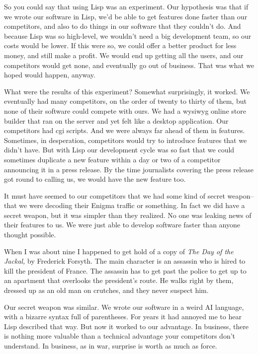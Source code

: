 So you could say that using Lisp was an experiment. Our hypothesis was
that if we wrote our software in Lisp, we'd be able to get features done
faster than our competitors, and also to do things in our software that
they couldn't do. And because Lisp was so high-level, we wouldn't need a
big development team, so our costs would be lower. If this were so, we
could offer a better product for less money, and still make a profit. We
would end up getting all the users, and our competitors would get none,
and eventually go out of business. That was what we hoped would happen,
anyway.

What were the results of this experiment? Somewhat surprisingly, it
worked. We eventually had many competitors, on the order of twenty to
thirty of them, but none of their software could compete with ours. We
had a wysiwyg online store builder that ran on the server and yet felt
like a desktop application. Our competitors had cgi scripts. And we were
always far ahead of them in features. Sometimes, in desperation,
competitors would try to introduce features that we didn't have. But
with Lisp our development cycle was so fast that we could sometimes
duplicate a new feature within a day or two of a competitor announcing
it in a press release. By the time journalists covering the press
release got round to calling us, we would have the new feature too.

It must have seemed to our competitors that we had some kind of secret
weapon-- that we were decoding their Enigma traffic or something. In
fact we did have a secret weapon, but it was simpler than they realized.
No one was leaking news of their features to us. We were just able to
develop software faster than anyone thought possible.

When I was about nine I happened to get hold of a copy of \emph{The Day
of the Jackal,} by Frederick Forsyth. The main character is an assassin
who is hired to kill the president of France. The assassin has to get
past the police to get up to an apartment that overlooks the president's
route. He walks right by them, dressed up as an old man on crutches, and
they never suspect him.

Our secret weapon was similar. We wrote our software in a weird AI
language, with a bizarre syntax full of parentheses. For years it had
annoyed me to hear Lisp described that way. But now it worked to our
advantage. In business, there is nothing more valuable than a technical
advantage your competitors don't understand. In business, as in war,
surprise is worth as much as force.

